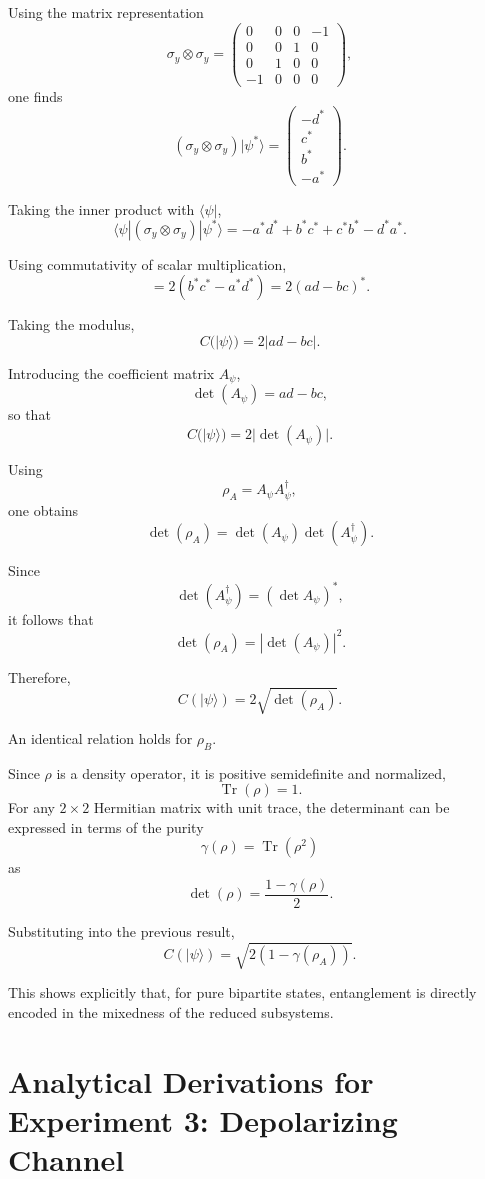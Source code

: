\documentclass[a4paper]{article}
\begin{document}
Using the matrix representation
\[
\sigma_y \otimes \sigma_y =
\begin{pmatrix}
0 & 0 & 0 & -1\\
0 & 0 & 1 & 0\\
0 & 1 & 0 & 0\\
-1 & 0 & 0 & 0
\end{pmatrix},
\]
one finds
\[
(\sigma_y \otimes \sigma_y)|\psi^*\rangle
=
\begin{pmatrix}
- d^*\\
c^*\\
b^*\\
- a^*
\end{pmatrix}.
\]

Taking the inner product with \(\langle \psi|\),
\[
\langle \psi | (\sigma_y \otimes \sigma_y)|\psi^*\rangle
=
- a^* d^* + b^* c^* + c^* b^* - d^* a^*.
\]

Using commutativity of scalar multiplication,
\[
=
2(b^*c^* - a^*d^*)
=
2(ad - bc)^*.
\]

Taking the modulus,
\[
C(|\psi\rangle)=2|ad-bc|.
\]

Introducing the coefficient matrix \(A_\psi\),
\[
\det(A_\psi) = ad - bc,
\]
so that
\[
C(|\psi\rangle)=2|\det(A_\psi)|.
\]


Using
\[
\rho_A = A_\psi A_\psi^\dagger,
\]
one obtains
\[
\det(\rho_A)
=
\det(A_\psi)\det(A_\psi^\dagger).
\]

Since
\[
\det(A_\psi^\dagger) = (\det A_\psi)^*,
\]
it follows that
\[
\det(\rho_A)=|\det(A_\psi)|^2.
\]

Therefore,
\[
C(|\psi\rangle)=2\sqrt{\det(\rho_A)}.
\]

An identical relation holds for \(\rho_B\).


Since $\rho$ is a density operator, it is positive semidefinite and normalized,
\[
\operatorname{Tr}(\rho) = 1.
\]
For any $2\times2$ Hermitian matrix with unit trace, the determinant can be expressed in terms of the purity
\[
\gamma(\rho) = \operatorname{Tr}(\rho^2)
\]
as
\[
\det(\rho)
=
\frac{1 - \gamma(\rho)}{2}.
\]

Substituting into the previous result,
\[
C(|\psi\rangle)
=
\sqrt{2\left(1 - \gamma(\rho_A)\right)}.
\]

This shows explicitly that, for pure bipartite states, entanglement is directly encoded in the mixedness of the reduced subsystems.
\section{Analytical Derivations for Experiment 3: Depolarizing Channel}
\end{document}
